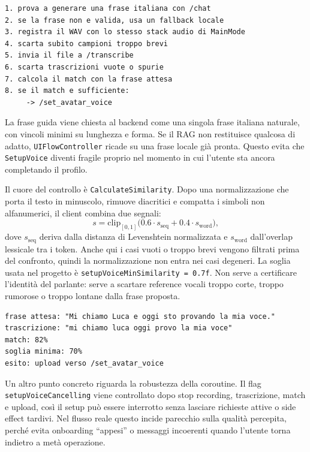 \begin{lstlisting}[basicstyle=\ttfamily\small,breaklines=true]
1. prova a generare una frase italiana con /chat
2. se la frase non e valida, usa un fallback locale
3. registra il WAV con lo stesso stack audio di MainMode
4. scarta subito campioni troppo brevi
5. invia il file a /transcribe
6. scarta trascrizioni vuote o spurie
7. calcola il match con la frase attesa
8. se il match e sufficiente:
     -> /set_avatar_voice
\end{lstlisting}

La frase guida viene chiesta al backend come una singola frase italiana naturale, con vincoli minimi su lunghezza e forma. Se il RAG non restituisce qualcosa di adatto, \texttt{UIFlowController} ricade su una frase locale già pronta. Questo evita che \texttt{SetupVoice} diventi fragile proprio nel momento in cui l'utente sta ancora completando il profilo.

Il cuore del controllo è \texttt{CalculateSimilarity}. Dopo una normalizzazione che porta il testo in minuscolo, rimuove diacritici e compatta i simboli non alfanumerici, il client combina due segnali:
\[
s = \mathrm{clip}_{[0,1]}\big(0.6 \cdot s_{\mathrm{seq}} + 0.4 \cdot s_{\mathrm{word}}\big),
\]
dove \(s_{\mathrm{seq}}\) deriva dalla distanza di Levenshtein normalizzata e \(s_{\mathrm{word}}\) dall'overlap lessicale tra i token. Anche qui i casi vuoti o troppo brevi vengono filtrati prima del confronto, quindi la normalizzazione non entra nei casi degeneri. La soglia usata nel progetto è \texttt{setupVoiceMinSimilarity = 0.7f}. Non serve a certificare l'identità del parlante: serve a scartare reference vocali troppo corte, troppo rumorose o troppo lontane dalla frase proposta.

\begin{lstlisting}[style=sfterminal,title={Esito tipico della validazione voce},caption={Il feedback che la UI costruisce prima di inviare il campione a Coqui.}]
frase attesa: "Mi chiamo Luca e oggi sto provando la mia voce."
trascrizione: "mi chiamo luca oggi provo la mia voce"
match: 82%
soglia minima: 70%
esito: upload verso /set_avatar_voice
\end{lstlisting}

\sloppy Un altro punto concreto riguarda la robustezza della coroutine. Il flag \texttt{setupVoiceCancelling} viene controllato dopo stop recording, trascrizione, match e upload, così il setup può essere interrotto senza lasciare richieste attive o side effect tardivi. Nel flusso reale questo incide parecchio sulla qualità percepita, perché evita onboarding ``appesi'' o messaggi incoerenti quando l'utente torna indietro a metà operazione.

